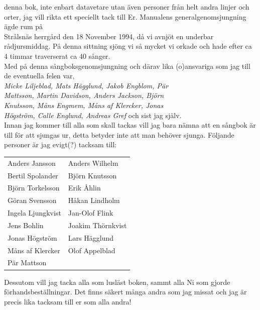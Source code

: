 \documentclass[a6paper,fontsize=10pt,twoside,open=right]{scrbook}
\begin{document}
denna bok, inte enbart datavetare utan även personer från helt andra
linjer och orter, jag vill rikta ett speciellt tack till Er.
\newpage
\indent Manualens generalgenomsjungning ägde rum på\\ Strålsnäs
herrgård den 18 November 1994, då vi avnjöt en underbar
rådjursmiddag. På denna sittning sjöng vi så mycket vi orkade och hade
efter ca 4 timmar traverserat ca 40 sånger.\\ \indent Med på denna
sångboksgenomsjungning och därav lika (o)ansvariga som jag till de
eventuella felen var,\\ \textit{Micke Liljeblad, Mats Hägglund, Jakob
  Engblom, Pär\\ Mattsson, Martin Davidson, Anders Jackson,
  Björn\\ Knutsson, Måns Engmem, Måns af Klercker, Jonas\\ Högström,
  Calle Englund, Andreas Gref} och sist jag själv.\\ \indent Innan jag
kommer till alla som skall tackas vill jag bara nämna att en sångbok
är till för att sjungas ur, detta betyder inte att man behöver
sjunga. Följande personer är jag evigt(?)  tacksam till:\\

\noindent
\begin{tabular}{@{}p{}p{}@{}}
  Anders Jansson & Anders Wilhelm\\
  Bertil Spolander & Björn Knutsson\\
  Björn Torkelsson & Erik Åhlin\\
  Göran Svensson & Håkan Lindholm\\
  Ingela Ljungkvist & Jan-Olof Flink\\
  Jens Bohlin & Joakim Thörnkvist\\
  Jonas Högström & Lars Hägglund\\
  Måns af Klercker & Olof Appelblad\\
  Pär Mattson
\end{tabular}
\newpage
\indent Dessutom vill jag tacka alla som lusläst boken, sammt alla Ni
som gjorde förhandsbeställningar. Det finns säkert många andra som jag
missat och jag är precis lika tacksam till er som alla
andra!\\

\end{document}
